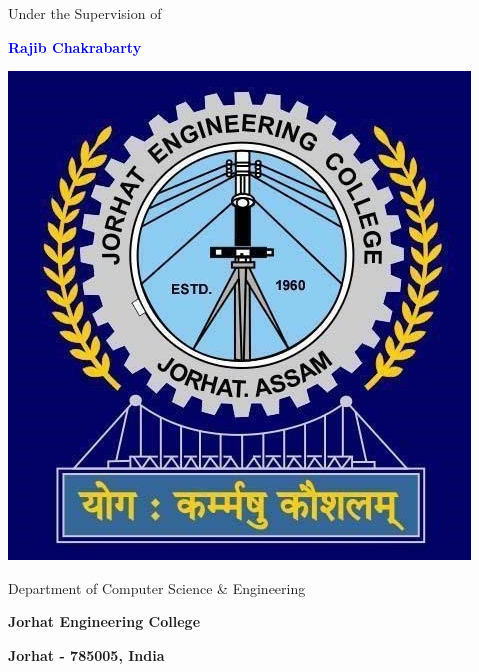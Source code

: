 \begin{titlepage}
\begin{center}
    { Under the Supervision of \par}
    {\large \textbf{\textbf{\textcolor{blue}{Rajib Chakrabarty}}}\par}
     \vspace{0.8 cm}

\includegraphics[width=0.25\linewidth]{Images/jec_logo.png}
     \vspace{0.6 cm}

    
    {\large Department of Computer Science \& Engineering\par}
    \vspace{0.4cm}

    {\large \textbf{Jorhat Engineering College}\par}
    \vspace{0.4cm}
    {\large \textbf{Jorhat - 785005, India}}
    \vspace{0.4cm}
    
\end{center}
\end{titlepage}
